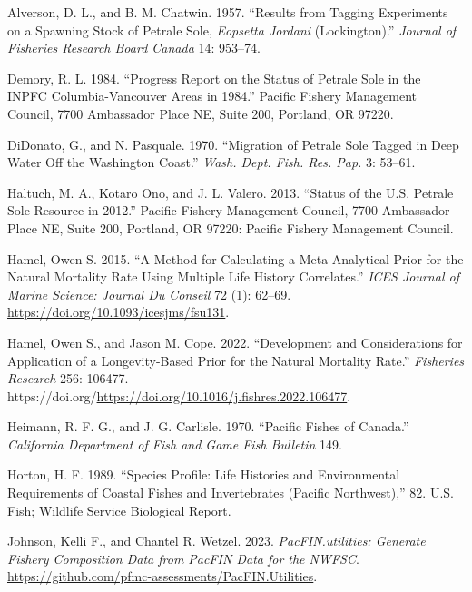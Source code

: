 \documentclass[
]{scrartcl}
\newlength{\cslhangindent}
\newenvironment{CSLReferences}[2] %
 {\begin{list}{}{%
  \setlength{\itemindent}{0pt}
  \setlength{\leftmargin}{0pt}
  \setlength{\parsep}{0pt}
  \ifodd #1
   \setlength{\leftmargin}{\cslhangindent}
   \setlength{\itemindent}{-1\cslhangindent}
  \fi
  \setlength{\itemsep}{#2\baselineskip}}}
 {\end{list}}
\begin{document}
\label{refs}
\begin{CSLReferences}{1}{0}
Alverson, D. L., and B. M. Chatwin. 1957. {``Results from Tagging
Experiments on a Spawning Stock of Petrale Sole, \emph{{Eopsetta}
Jordani} ({Lockington}).''} \emph{Journal of Fisheries Research Board
Canada} 14: 953--74.

Demory, R. L. 1984. {``Progress Report on the Status of Petrale Sole in
the {INPFC} {Columbia}-{Vancouver} Areas in 1984.''} Pacific Fishery
Management Council, 7700 Ambassador Place NE, Suite 200, Portland, OR
97220.

DiDonato, G., and N. Pasquale. 1970. {``Migration of Petrale Sole Tagged
in Deep Water Off the {Washington} Coast.''} \emph{Wash. Dept. Fish.
Res. Pap.} 3: 53--61.

Haltuch, M. A., Kotaro Ono, and J. L. Valero. 2013. {``Status of the
{U}.{S}. Petrale Sole Resource in 2012.''} Pacific Fishery Management
Council, 7700 Ambassador Place NE, Suite 200, Portland, OR 97220:
Pacific Fishery Management Council.

Hamel, Owen S. 2015. {``A Method for Calculating a Meta-Analytical Prior
for the Natural Mortality Rate Using Multiple Life History
Correlates.''} \emph{ICES Journal of Marine Science: Journal Du Conseil}
72 (1): 62--69. \url{https://doi.org/10.1093/icesjms/fsu131}.

Hamel, Owen S., and Jason M. Cope. 2022. {``Development and
Considerations for Application of a Longevity-Based Prior for the
Natural Mortality Rate.''} \emph{Fisheries Research} 256: 106477.
https://doi.org/\url{https://doi.org/10.1016/j.fishres.2022.106477}.

Heimann, R. F. G., and J. G. Carlisle. 1970. {``Pacific {Fishes} of
{Canada}.''} \emph{California Department of Fish and Game Fish Bulletin}
149.

Horton, H. F. 1989. {``Species Profile: Life Histories and Environmental
Requirements of Coastal Fishes and Invertebrates ({Pacific}
{Northwest}),''} 82. U.S. Fish; Wildlife Service Biological Report.

Johnson, Kelli F., and Chantel R. Wetzel. 2023. \emph{PacFIN.utilities:
Generate Fishery Composition Data from PacFIN Data for the NWFSC}.
\url{https://github.com/pfmc-assessments/PacFIN.Utilities}.


\end{CSLReferences}
\end{document}
